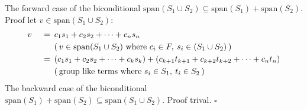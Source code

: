 \documentclass{article}
\newcommand{\evidence}[1]{\ensuremath{(\hspace{0.2em} \text{#1} \hspace{0.2em})}}
\newcommand{\relation}[1]{\ensuremath{\hspace{0.2em} {{} #1 {}} \hspace{0.2em}}}
\newcommand{\equal}{\relation{=}}
\newcommand{\qed}{\hfill\ensuremath{\square}}
\begin{document}
The forward case of the biconditional
$\text{span}(S_1 \cup S_2) \subseteq \text{span}(S_1)
+ \text{span}(S_2)$. Proof let $v \in \text{span}(S_1 \cup S_2)$:
\begin{alignat*}{3}
  & v  & \equal & c_1s_1 + c_2s_2 + \dots + c_ns_n \\
  & {} & {}     & \evidence{$v \in \text{span}(S_1 \cup S_2)$ where $c_i \in F, \: s_i \in (S_1 \cup S_2)$} \\  
  & {} & \equal & (c_1s_1 + c_2s_2 + \dots + c_ks_k) +
                  (c_{k + 1}t_{k + 1} + c_{k + 2}t_{k+2} + \dots + c_nt_n) \\
  & {} & {}     & \evidence{group like terms where $s_i \in S_1, \: t_i \in S_2$} 
\end{alignat*} 
The backward case of the biconditional
$\text{span}(S_1) + \text{span}(S_2) \subseteq \text{span}(S_1 \cup S_2)$.
Proof trival. \qed
\end{document}
